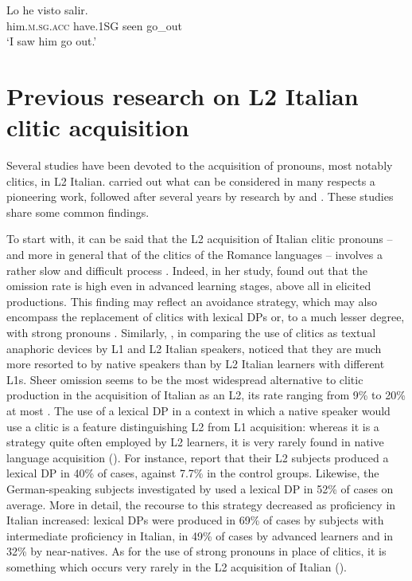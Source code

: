 \documentclass[output=paper,modfonts,nonflat,newtxmath]{langsci/langscibook}
\begin{document}
\ea \label{ex:sciutti:27}
    \gll Lo he visto salir.\\
         him.\textsc{m.sg.acc} have.{1SG} seen go\_out \\
    \glt  ‘I saw him go out.’
\z


\section{{Previous} {research} {on} {L2} {Italian} {clitic} acquisition} %
\label{sec:sciutti:3}

Several studies have been devoted to the acquisition of pronouns, most notably clitics, in L2 Italian. \citet{Berretta1986} carried out what can be considered in many respects a pioneering work, followed after several years by research by \citet{LeoniniBelletti2004, GianniniCancila2006, Santoro2007, Giannini2008} and \citet{Maffei2009}. These studies share some common findings.

To start with, it can be said that the L2 acquisition of Italian clitic pronouns – and more in general that of the clitics of the Romance languages – involves a rather slow and difficult process \citet{(BruhnMontrul1996, White1996, DuffieldWhite1999, DuffieldEtAl2002, Santoro2007)}. Indeed, in her study, \citet{Giannini2008} found out that the omission rate is high even in advanced learning stages, above all in elicited productions. This finding may reflect an avoidance strategy, which may also encompass the replacement of clitics with lexical DPs or, to a much lesser degree, with strong pronouns \citet{LeoniniBelletti2004}. Similarly, \citet[191]{ChiniEtAl2003}, in comparing the use of clitics as textual anaphoric devices by L1 and L2 Italian speakers, noticed that they are much more resorted to by native speakers than by L2 Italian learners with different L1s. Sheer omission seems to be the most widespread alternative to clitic production in the acquisition of Italian as an L2, its rate ranging from 9\% to 20\% at most \citet{BellettiGuasti2015}. The use of a lexical DP in a context in which a native speaker would use a clitic is a feature distinguishing L2 from L1 acquisition: whereas it is a strategy quite often employed by L2 learners, it is very rarely found in native language acquisition (\citealt{BellettiGuasti2015}). For instance, \citet{LeoniniBelletti2004} report that their L2 subjects produced a lexical DP in 40\% of cases, against 7.7\% in the control groups. Likewise, the German-speaking subjects investigated by \citet{Leonini2006} used a lexical DP in 52\% of cases on average. More in detail, the recourse to this strategy decreased as proficiency in Italian increased: lexical DPs were produced in 69\% of cases by subjects with intermediate proficiency in Italian, in 49\% of cases by advanced learners and in 32\% by near-natives. As for the use of strong pronouns in place of clitics, it is something which occurs very rarely in the L2 acquisition of Italian (\citealt{BellettiGuasti2015}).
\end{document}
